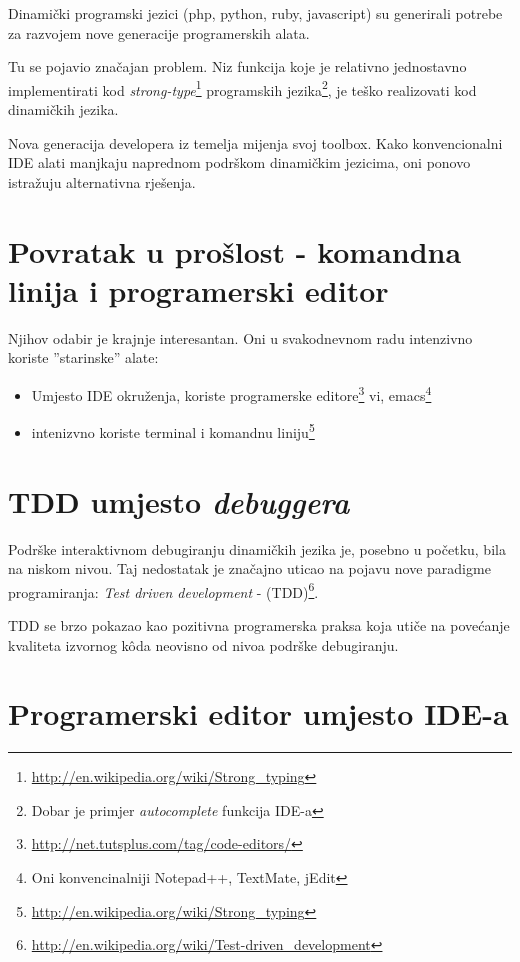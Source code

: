 \documentclass[times, utf8, seminar]{fit}
\begin{document}
Dinamički programski jezici (php, python, ruby, javascript) su generirali potrebe za razvojem nove generacije programerskih alata. 

Tu se pojavio značajan problem. Niz funkcija koje je relativno jednostavno implementirati kod \emph{strong-type}\footnote{\url{http://en.wikipedia.org/wiki/Strong_typing}} programskih jezika\footnote{Dobar je primjer \emph{autocomplete} funkcija IDE-a}, je teško realizovati kod dinamičkih jezika.

Nova generacija developera iz temelja mijenja svoj toolbox. Kako konvencionalni IDE alati manjkaju naprednom podrškom dinamičkim jezicima, oni ponovo istražuju alternativna rješenja.

\section{Povratak u prošlost - komandna linija i programerski editor}

Njihov odabir je krajnje interesantan. Oni u svakodnevnom radu intenzivno koriste ''starinske'' alate:
\begin{itemize}
  \item Umjesto IDE okruženja, koriste programerske editore\footnote{\url{http://net.tutsplus.com/tag/code-editors/}} vi, emacs\footnote{Oni konvencinalniji Notepad++, TextMate, jEdit}
  \item intenizvno koriste terminal i komandnu liniju\footnote{\url{http://en.wikipedia.org/wiki/Strong_typing}} 
\end{itemize}

\section{TDD umjesto \emph{debuggera}}

Podrške interaktivnom debugiranju dinamičkih jezika je, posebno u početku, bila na niskom nivou. Taj nedostatak je značajno uticao na pojavu nove paradigme programiranja: \emph{Test driven development} - (TDD)\footnote{\url{http://en.wikipedia.org/wiki/Test-driven_development}}.

TDD se brzo pokazao kao pozitivna programerska praksa koja utiče na povećanje kvaliteta izvornog k\^oda neovisno od nivoa podrške debugiranju. 

\section{Programerski editor umjesto IDE-a}
\end{document}
